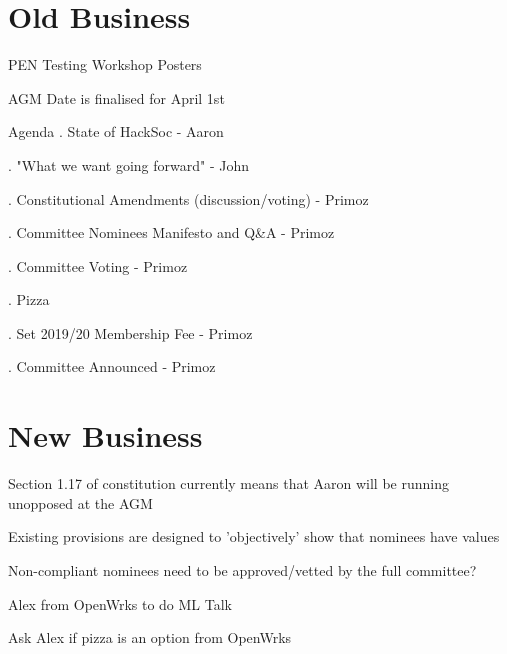 \documentclass[11pt,hacksoc]{meetingmins}
\begin{document}
\section{Old Business}
\begin{items}
	\item
	PEN Testing Workshop Posters
		\subitem
		
	\item
	AGM
		\subitem
		Date is finalised for April 1st
		
		\subitem
		Agenda
			. State of HackSoc - Aaron
			
			. "What we want going forward" - John
			
			. Constitutional Amendments (discussion/voting) - Primoz
			
			. Committee Nominees Manifesto and Q\&A - Primoz
			
			. Committee Voting - Primoz
			
			. Pizza
			
			. Set 2019/20 Membership Fee - Primoz
			
			. Committee Announced - Primoz
			
		\subitem
			\subsubitem
		
		\subitem
	
	\item
	
\end{items}

\section{New Business}
\begin{items}
	\item
	Section 1.17 of constitution currently means that Aaron will be running unopposed at the AGM
	
		\subitem
		Existing provisions are designed to 'objectively' show that nominees have values 
		
		\subitem
		Non-compliant nominees need to be approved/vetted by the full committee?
		
		\subitem
		
	\item
	Alex from OpenWrks to do ML Talk
		\subitem
		
		\subitem
		Ask Alex if pizza is an option from OpenWrks
		
		
\end{items}

\vspace{1em}
\end{document}
